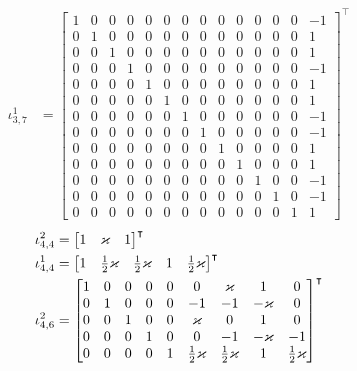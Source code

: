 \documentclass{amsart}
\begin{document}
\begin{align*}
\iota_{3,7}^1&=  
\begin{bmatrix}
 1 & 0 & 0 & 0 & 0 & 0 & 0 & 0 & 0 & 0 & 0 & 0 & 0 &-1\\
 0 & 1 & 0 & 0 & 0 & 0 & 0 & 0 & 0 & 0 & 0 & 0 & 0 & 1\\
 0 & 0 & 1 & 0 & 0 & 0 & 0 & 0 & 0 & 0 & 0 & 0 & 0 & 1\\
 0 & 0 & 0 & 1 & 0 & 0 & 0 & 0 & 0 & 0 & 0 & 0 & 0 &-1\\
 0 & 0 & 0 & 0 & 1 & 0 & 0 & 0 & 0 & 0 & 0 & 0 & 0 & 1\\
 0 & 0 & 0 & 0 & 0 & 1 & 0 & 0 & 0 & 0 & 0 & 0 & 0 & 1\\
 0 & 0 & 0 & 0 & 0 & 0 & 1 & 0 & 0 & 0 & 0 & 0 & 0 &-1\\
 0 & 0 & 0 & 0 & 0 & 0 & 0 & 1 & 0 & 0 & 0 & 0 & 0 &-1\\
 0 & 0 & 0 & 0 & 0 & 0 & 0 & 0 & 1 & 0 & 0 & 0 & 0 & 1\\
 0 & 0 & 0 & 0 & 0 & 0 & 0 & 0 & 0 & 1 & 0 & 0 & 0 & 1\\
 0 & 0 & 0 & 0 & 0 & 0 & 0 & 0 & 0 & 0 & 1 & 0 & 0 &-1\\
 0 & 0 & 0 & 0 & 0 & 0 & 0 & 0 & 0 & 0 & 0 & 1 & 0 &-1\\
 0 & 0 & 0 & 0 & 0 & 0 & 0 & 0 & 0 & 0 & 0 & 0 & 1 & 1
\end{bmatrix}^\intercal
\end{align*}
\begin{align*}
  \iota_{4,4}^2&=  
\begin{bmatrix}
  1 & \varkappa & 1
\end{bmatrix}^\intercal\\
\iota_{4,4}^1&=  
\begin{bmatrix}
  1 & \frac{1}{2}\varkappa & \frac{1}{2}\varkappa & 1 & \frac{1}{2}\varkappa
\end{bmatrix}^\intercal\\
\iota_{4,6}^2 &=
\begin{bmatrix}
  1& 0& 0& 0& 0& 0& \varkappa & 1& 0\\
  0& 1& 0& 0& 0& -1& -1& -\varkappa &0\\
  0& 0& 1& 0& 0& \varkappa& 0 &1 &0\\
  0& 0& 0& 1& 0& 0& -1& -\varkappa &-1\\
  0& 0& 0& 0& 1& \frac{1}{2}\varkappa& \frac{1}{2}\varkappa &1 &\frac{1}{2}\varkappa
\end{bmatrix}^\intercal
\end{align*}
\end{document}
